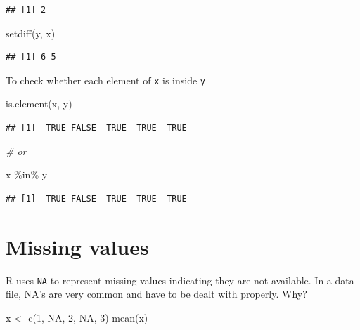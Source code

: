 \documentclass[
]{book}
\newenvironment{Shaded}{\begin{snugshade}}{\end{snugshade}}
\newcommand{\CommentTok}[1]{\textcolor[rgb]{0.56,0.35,0.01}{\textit{#1}}}
\newcommand{\ConstantTok}[1]{\textcolor[rgb]{0.00,0.00,0.00}{#1}}
\newcommand{\DecValTok}[1]{\textcolor[rgb]{0.00,0.00,0.81}{#1}}
\newcommand{\FunctionTok}[1]{\textcolor[rgb]{0.00,0.00,0.00}{#1}}
\newcommand{\NormalTok}[1]{#1}
\newcommand{\OtherTok}[1]{\textcolor[rgb]{0.56,0.35,0.01}{#1}}
\newcommand{\SpecialCharTok}[1]{\textcolor[rgb]{0.00,0.00,0.00}{#1}}
\theoremstyle{definition}
\theoremstyle{definition}
\theoremstyle{definition}
\theoremstyle{definition}
\theoremstyle{remark}
\begin{document}
\begin{verbatim}
## [1] 2
\end{verbatim}

\begin{Shaded}
\begin{Highlighting}[]
\FunctionTok{setdiff}\NormalTok{(y, x)}
\end{Highlighting}
\end{Shaded}

\begin{verbatim}
## [1] 6 5
\end{verbatim}

To check whether each element of \texttt{x} is inside \texttt{y}

\begin{Shaded}
\begin{Highlighting}[]
\FunctionTok{is.element}\NormalTok{(x, y)}
\end{Highlighting}
\end{Shaded}

\begin{verbatim}
## [1]  TRUE FALSE  TRUE  TRUE  TRUE
\end{verbatim}

\begin{Shaded}
\begin{Highlighting}[]
\CommentTok{\# or}

\NormalTok{x }\SpecialCharTok{\%in\%}\NormalTok{ y}
\end{Highlighting}
\end{Shaded}

\begin{verbatim}
## [1]  TRUE FALSE  TRUE  TRUE  TRUE
\end{verbatim}

\hypertarget{missing-values}{%
\section{Missing values}\label{missing-values}}

R uses \texttt{NA} to represent missing values indicating they are not available. In a data file, NA's are very common and have to be dealt with properly. Why?

\begin{Shaded}
\begin{Highlighting}[]
\NormalTok{x }\OtherTok{\textless{}{-}} \FunctionTok{c}\NormalTok{(}\DecValTok{1}\NormalTok{, }\ConstantTok{NA}\NormalTok{, }\DecValTok{2}\NormalTok{, }\ConstantTok{NA}\NormalTok{, }\DecValTok{3}\NormalTok{)}
\FunctionTok{mean}\NormalTok{(x)}
\end{Highlighting}
\end{Shaded}
\end{document}

